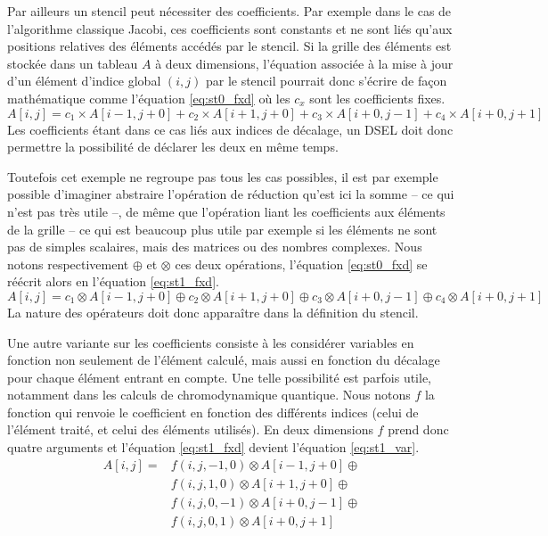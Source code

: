Par ailleurs un stencil peut nécessiter des coefficients. Par exemple dans le cas de l'algorithme classique Jacobi, ces coefficients sont constants et ne sont liés qu'aux positions relatives des éléments accédés par le stencil. Si la grille des éléments est stockée dans un tableau $A$ à deux dimensions, l'équation associée à la mise à jour d'un élément d'indice global $(i,j)$ par le stencil pourrait donc s'écrire de façon mathématique comme l'équation \ref{eq:st0_fxd} où les $c_x$ sont les coefficients fixes.
\begin{equation}
\label{eq:st0_fxd}
A[i,j] = c_1 \times A[i-1,j+0] + c_2 \times A[i+1,j+0] + c_3 \times A[i+0,j-1] + c_4 \times A[i+0,j+1]
\end{equation}
Les coefficients étant dans ce cas liés aux indices de décalage, un DSEL doit donc permettre la possibilité de déclarer les deux en même temps.

Toutefois cet exemple ne regroupe pas tous les cas possibles, il est par exemple possible d'imaginer abstraire l'opération de réduction qu'est ici la somme -- ce qui n'est pas très utile --, de même que l'opération liant les coefficients aux éléments de la grille -- ce qui est beaucoup plus utile par exemple si les éléments ne sont pas de simples scalaires, mais des matrices ou des nombres complexes. Nous notons respectivement $\oplus$ et $\otimes$ ces deux opérations, l'équation \ref{eq:st0_fxd} se réécrit alors en l'équation \ref{eq:st1_fxd}.
\begin{equation}
\label{eq:st1_fxd}
A[i,j] = c_1 \otimes A[i-1,j+0] \oplus c_2 \otimes A[i+1,j+0] \oplus c_3 \otimes A[i+0,j-1] \oplus c_4 \otimes A[i+0,j+1]
\end{equation}
La nature des opérateurs doit donc apparaître dans la définition du stencil.

Une autre variante sur les coefficients consiste à les considérer variables en fonction non seulement de l'élément calculé, mais aussi en fonction du décalage pour chaque élément entrant en compte. Une telle possibilité est parfois utile, notamment dans les calculs de chromodynamique quantique. Nous notons $f$ la fonction qui renvoie le coefficient en fonction des différents indices (celui de l'élément traité, et celui des éléments utilisés). En deux dimensions $f$ prend donc quatre arguments et l'équation \ref{eq:st1_fxd} devient l'équation \ref{eq:st1_var}.
\begin{equation}
\label{eq:st1_var}
\begin{aligned}
A[i,j] = & f(i, j, -1,  0) \otimes A[i-1,j+0] \oplus \\
         & f(i, j,  1,  0) \otimes A[i+1,j+0] \oplus \\
         & f(i, j,  0, -1) \otimes A[i+0,j-1] \oplus \\ 
         & f(i, j,  0,  1) \otimes A[i+0,j+1]
\end{aligned}
\end{equation}

